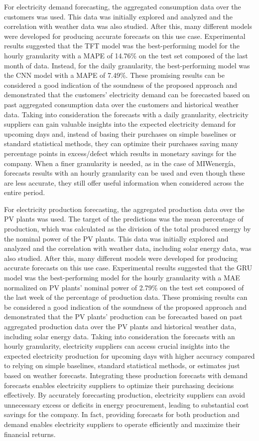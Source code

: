 For electricity demand forecasting, the aggregated consumption data over the customers was used.
This data was initially explored and analyzed and the correlation with weather data was also studied.
After this, many different models were developed for producing accurate forecasts on this use case.
Experimental results suggested that the TFT model was the best-performing model for the hourly granularity with a MAPE of 14.76\% on the test set composed of the last month of data.
Instead, for the daily granularity, the best-performing model was the CNN model with a MAPE of 7.49\%.
These promising results can be considered a good indication of the soundness of the proposed approach and demonstrated that the customers' electricity demand can be forecasted based on past aggregated consumption data over the customers and historical weather data.
Taking into consideration the forecasts with a daily granularity, electricity suppliers can gain valuable insights into the expected electricity demand for upcoming days and, instead of basing their purchases on simple baselines or standard statistical methods, they can optimize their purchases saving many percentage points in excess/defect which results in monetary savings for the company.
When a finer granularity is needed, as in the case of MIWenergía, forecasts results with an hourly granularity can be used and even though these are less accurate, they still offer useful information when considered across the entire period.

For electricity production forecasting, the aggregated production data over the PV plants was used.
The target of the predictions was the mean percentage of production, which was calculated as the division of the total produced energy by the nominal power of the PV plants.
This data was initially explored and analyzed and the correlation with weather data, including solar energy data, was also studied.
After this, many different models were developed for producing accurate forecasts on this use case.
Experimental results suggested that the GRU model was the best-performing model for the hourly granularity with a MAE normalized on PV plants' nominal power of 2.79\% on the test set composed of the last week of the percentage of production data.
These promising results can be considered a good indication of the soundness of the proposed approach and demonstrated that the PV plants' production can be forecasted based on past aggregated production data over the PV plants and historical weather data, including solar energy data.
Taking into consideration the forecasts with an hourly granularity, electricity suppliers can access crucial insights into the expected electricity production for upcoming days with higher accuracy compared to relying on simple baselines, standard statistical methods, or estimates just based on weather forecasts.
Integrating these production forecasts with demand forecasts enables electricity suppliers to optimize their purchasing decisions effectively.
By accurately forecasting production, electricity suppliers can avoid unnecessary excess or deficits in energy procurement, leading to substantial cost savings for the company.
In fact, providing forecasts for both production and demand enables electricity suppliers to operate efficiently and maximize their financial returns.

